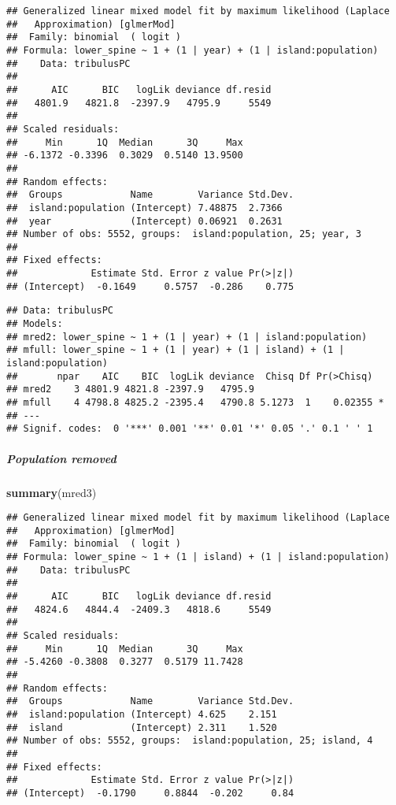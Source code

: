 \documentclass[
]{article}
\newenvironment{Shaded}{\begin{snugshade}}{\end{snugshade}}
\newcommand{\KeywordTok}[1]{\textcolor[rgb]{0.13,0.29,0.53}{\textbf{#1}}}
\newcommand{\NormalTok}[1]{#1}
\begin{document}
\begin{verbatim}
## Generalized linear mixed model fit by maximum likelihood (Laplace
##   Approximation) [glmerMod]
##  Family: binomial  ( logit )
## Formula: lower_spine ~ 1 + (1 | year) + (1 | island:population)
##    Data: tribulusPC
## 
##      AIC      BIC   logLik deviance df.resid 
##   4801.9   4821.8  -2397.9   4795.9     5549 
## 
## Scaled residuals: 
##     Min      1Q  Median      3Q     Max 
## -6.1372 -0.3396  0.3029  0.5140 13.9500 
## 
## Random effects:
##  Groups            Name        Variance Std.Dev.
##  island:population (Intercept) 7.48875  2.7366  
##  year              (Intercept) 0.06921  0.2631  
## Number of obs: 5552, groups:  island:population, 25; year, 3
## 
## Fixed effects:
##             Estimate Std. Error z value Pr(>|z|)
## (Intercept)  -0.1649     0.5757  -0.286    0.775
\end{verbatim}

\begin{verbatim}
## Data: tribulusPC
## Models:
## mred2: lower_spine ~ 1 + (1 | year) + (1 | island:population)
## mfull: lower_spine ~ 1 + (1 | year) + (1 | island) + (1 | island:population)
##       npar    AIC    BIC  logLik deviance  Chisq Df Pr(>Chisq)  
## mred2    3 4801.9 4821.8 -2397.9   4795.9                       
## mfull    4 4798.8 4825.2 -2395.4   4790.8 5.1273  1    0.02355 *
## ---
## Signif. codes:  0 '***' 0.001 '**' 0.01 '*' 0.05 '.' 0.1 ' ' 1
\end{verbatim}

\hypertarget{population-removed}{%
\subparagraph{Population removed}\label{population-removed}}

\begin{Shaded}
\begin{Highlighting}[]
\KeywordTok{summary}\NormalTok{(mred3)}
\end{Highlighting}
\end{Shaded}

\begin{verbatim}
## Generalized linear mixed model fit by maximum likelihood (Laplace
##   Approximation) [glmerMod]
##  Family: binomial  ( logit )
## Formula: lower_spine ~ 1 + (1 | island) + (1 | island:population)
##    Data: tribulusPC
## 
##      AIC      BIC   logLik deviance df.resid 
##   4824.6   4844.4  -2409.3   4818.6     5549 
## 
## Scaled residuals: 
##     Min      1Q  Median      3Q     Max 
## -5.4260 -0.3808  0.3277  0.5179 11.7428 
## 
## Random effects:
##  Groups            Name        Variance Std.Dev.
##  island:population (Intercept) 4.625    2.151   
##  island            (Intercept) 2.311    1.520   
## Number of obs: 5552, groups:  island:population, 25; island, 4
## 
## Fixed effects:
##             Estimate Std. Error z value Pr(>|z|)
## (Intercept)  -0.1790     0.8844  -0.202     0.84
\end{verbatim}
\end{document}
